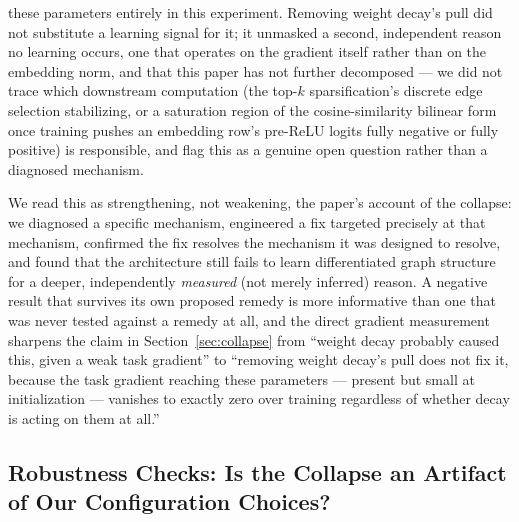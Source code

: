 \documentclass[journal]{IEEEtran}
\begin{document}
these parameters entirely in this experiment. Removing weight decay's pull did not substitute a learning signal for it; it unmasked a second, independent reason no learning occurs, one that operates on the gradient itself rather than on the embedding norm, and that this paper has not further decomposed --- we did not trace which downstream computation (the top-$k$ sparsification's discrete edge selection stabilizing, or a saturation region of the cosine-similarity bilinear form once training pushes an embedding row's pre-ReLU logits fully negative or fully positive) is responsible, and flag this as a genuine open question rather than a diagnosed mechanism.

We read this as strengthening, not weakening, the paper's account of the collapse: we diagnosed a specific mechanism, engineered a fix targeted precisely at that mechanism, confirmed the fix resolves the mechanism it was designed to resolve, and found that the architecture still fails to learn differentiated graph structure for a deeper, independently \emph{measured} (not merely inferred) reason. A negative result that survives its own proposed remedy is more informative than one that was never tested against a remedy at all, and the direct gradient measurement sharpens the claim in Section~\ref{sec:collapse} from ``weight decay probably caused this, given a weak task gradient'' to ``removing weight decay's pull does not fix it, because the task gradient reaching these parameters --- present but small at initialization --- vanishes to exactly zero over training regardless of whether decay is acting on them at all.''

\subsection{Robustness Checks: Is the Collapse an Artifact of Our Configuration Choices?}
\label{sec:robustness}
\end{document}
